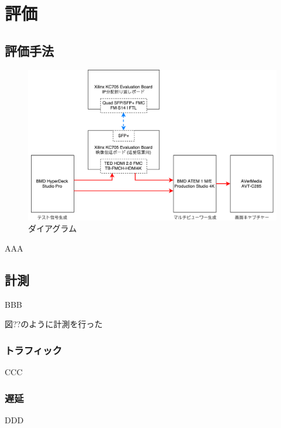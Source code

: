 \chapter{評価}
\label{chap:evaluation}

\section{評価手法}

\begin{figure}[htbp]
  \begin{center}
    \includegraphics[bb=0 0 697 422,width=15.5cm]{img/evaluate-diagram.pdf}
  \end{center}
  \caption{ダイアグラム}
  \label{fig:evaluate-diagram}
\end{figure}

AAA

\section{計測}

BBB

図??のように計測を行った

\subsection{トラフィック}

CCC

\subsection{遅延}

DDD

